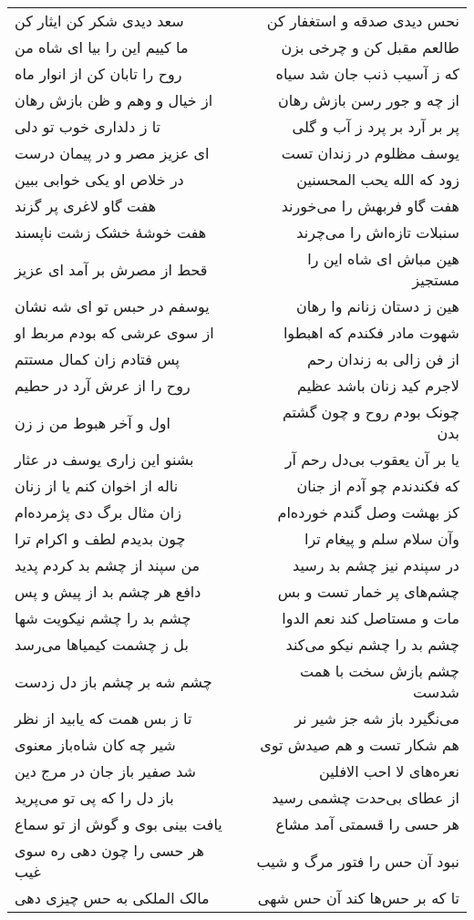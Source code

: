 \begin{center}
\begin{longtable}{l p{0.5cm} r}
سعد دیدی شکر کن ایثار کن
&&
نحس دیدی صدقه و استغفار کن
\\
ما کییم این را بیا ای شاه من
&&
طالعم مقبل کن و چرخی بزن
\\
روح را تابان کن از انوار ماه
&&
که ز آسیب ذنب جان شد سیاه
\\
از خیال و وهم و ظن بازش رهان
&&
از چه و جور رسن بازش رهان
\\
تا ز دلداری خوب تو دلی
&&
پر بر آرد بر پرد ز آب و گلی
\\
ای عزیز مصر و در پیمان درست
&&
یوسف مظلوم در زندان تست
\\
در خلاص او یکی خوابی ببین
&&
زود که الله یحب المحسنین
\\
هفت گاو لاغری پر گزند
&&
هفت گاو فربهش را می‌خورند
\\
هفت خوشهٔ خشک زشت ناپسند
&&
سنبلات تازه‌اش را می‌چرند
\\
قحط از مصرش بر آمد ای عزیز
&&
هین مباش ای شاه این را مستجیز
\\
یوسفم در حبس تو ای شه نشان
&&
هین ز دستان زنانم وا رهان
\\
از سوی عرشی که بودم مربط او
&&
شهوت مادر فکندم که اهبطوا
\\
پس فتادم زان کمال مستتم
&&
از فن زالی به زندان رحم
\\
روح را از عرش آرد در حطیم
&&
لاجرم کید زنان باشد عظیم
\\
اول و آخر هبوط من ز زن
&&
چونک بودم روح و چون گشتم بدن
\\
بشنو این زاری یوسف در عثار
&&
یا بر آن یعقوب بی‌دل رحم آر
\\
ناله از اخوان کنم یا از زنان
&&
که فکندندم چو آدم از جنان
\\
زان مثال برگ دی پژمرده‌ام
&&
کز بهشت وصل گندم خورده‌ام
\\
چون بدیدم لطف و اکرام ترا
&&
وآن سلام سلم و پیغام ترا
\\
من سپند از چشم بد کردم پدید
&&
در سپندم نیز چشم بد رسید
\\
دافع هر چشم بد از پیش و پس
&&
چشم‌های پر خمار تست و بس
\\
چشم بد را چشم نیکویت شها
&&
مات و مستاصل کند نعم الدوا
\\
بل ز چشمت کیمیاها می‌رسد
&&
چشم بد را چشم نیکو می‌کند
\\
چشم شه بر چشم باز دل زدست
&&
چشم بازش سخت با همت شدست
\\
تا ز بس همت که یابید از نظر
&&
می‌نگیرد باز شه جز شیر نر
\\
شیر چه کان شاه‌باز معنوی
&&
هم شکار تست و هم صیدش توی
\\
شد صفیر باز جان در مرج دین
&&
نعره‌های لا احب الافلین
\\
باز دل را که پی تو می‌پرید
&&
از عطای بی‌حدت چشمی رسید
\\
یافت بینی بوی و گوش از تو سماع
&&
هر حسی را قسمتی آمد مشاع
\\
هر حسی را چون دهی ره سوی غیب
&&
نبود آن حس را فتور مرگ و شیب
\\
مالک الملکی به حس چیزی دهی
&&
تا که بر حس‌ها کند آن حس شهی
\\
\end{longtable}
\end{center}
